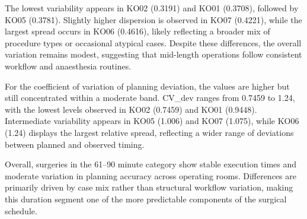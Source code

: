 \documentclass[
]{article}
\begin{document}
The lowest variability appears in KO02 (0.3191) and KO01 (0.3708),
followed by KO05 (0.3781). Slightly higher dispersion is observed in
KO07 (0.4221), while the largest spread occurs in KO06 (0.4616), likely
reflecting a broader mix of procedure types or occasional atypical
cases. Despite these differences, the overall variation remains modest,
suggesting that mid-length operations follow consistent workflow and
anaesthesia routines.

For the coefficient of variation of planning deviation, the values are
higher but still concentrated within a moderate band. CV\_dev ranges
from 0.7459 to 1.24, with the lowest levels observed in KO02 (0.7459)
and KO01 (0.9448). Intermediate variability appears in KO05 (1.006) and
KO07 (1.075), while KO06 (1.24) displays the largest relative spread,
reflecting a wider range of deviations between planned and observed
timing.

Overall, surgeries in the 61--90 minute category show stable execution
times and moderate variation in planning accuracy across operating
rooms. Differences are primarily driven by case mix rather than
structural workflow variation, making this duration segment one of the
more predictable components of the surgical schedule.
\end{document}
